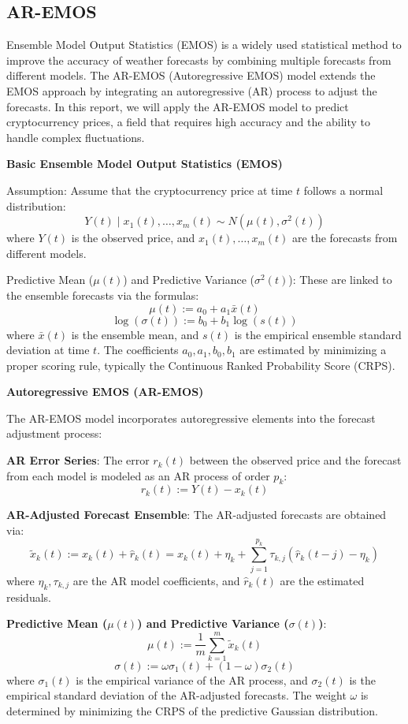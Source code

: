 \documentclass{ieeeojies}
\begin{document}
\subsection{AR-EMOS}

Ensemble Model Output Statistics (EMOS)\cite{b20} is a widely used statistical method to improve the accuracy of weather forecasts by combining multiple forecasts from different models. The AR-EMOS (Autoregressive EMOS)\cite{b21} model extends the EMOS approach by integrating an autoregressive (AR) process to adjust the forecasts. In this report, we will apply the AR-EMOS model to predict cryptocurrency prices, a field that requires high accuracy and the ability to handle complex fluctuations.


\textbf{Basic Ensemble Model Output Statistics (EMOS)}

Assumption: Assume that the cryptocurrency price at time $t$ follows a normal distribution:
\[
Y(t) \mid x_1(t), \ldots, x_m(t) \sim N(\mu(t), \sigma^2(t))
\]
where $Y(t)$ is the observed price, and $x_1(t), \ldots, x_m(t)$ are the forecasts from different models.

Predictive Mean ($\mu(t)$) and Predictive Variance ($\sigma^2(t)$): These are linked to the ensemble forecasts via the formulas:
\[
\mu(t) := a_0 + a_1 \bar{x}(t)
\]
\[
\log(\sigma(t)) := b_0 + b_1 \log(s(t))
\]
where $\bar{x}(t)$ is the ensemble mean, and $s(t)$ is the empirical ensemble standard deviation at time $t$. The coefficients $a_0, a_1, b_0, b_1$ are estimated by minimizing a proper scoring rule, typically the Continuous Ranked Probability Score (CRPS).

\textbf{Autoregressive EMOS (AR-EMOS)}

The AR-EMOS model incorporates autoregressive elements into the forecast adjustment process:

\textbf{AR Error Series}: The error $r_k(t)$ between the observed price and the forecast from each model is modeled as an AR process of order $p_k$:
\[
r_k(t) := Y(t) - x_k(t)
\]

\textbf{AR-Adjusted Forecast Ensemble}: The AR-adjusted forecasts are obtained via:
\[
\tilde{x}_k(t) := x_k(t) + \hat{r}_k(t) = x_k(t) + \eta_k + \sum_{j=1}^{p_k} \tau_{k,j} (\hat{r}_k(t-j) - \eta_k)
\]
where $\eta_k, \tau_{k,j}$ are the AR model coefficients, and $\hat{r}_k(t)$ are the estimated residuals.

\textbf{Predictive Mean ($\mu(t)$) and Predictive Variance ($\sigma(t)$)}:
\[
\mu(t) := \frac{1}{m} \sum_{k=1}^{m} \tilde{x}_k(t)
\]
\[
\sigma(t) := \omega \sigma_1(t) + (1 - \omega) \sigma_2(t)
\]
where $\sigma_1(t)$ is the empirical variance of the AR process, and $\sigma_2(t)$ is the empirical standard deviation of the AR-adjusted forecasts. The weight $\omega$ is determined by minimizing the CRPS of the predictive Gaussian distribution.
\end{document}
